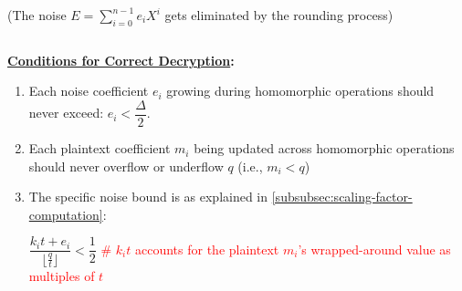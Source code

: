 \begin{tcolorbox}[title={\textbf{\tboxlabel{\ref*{subsec:bfv-enc-dec}} BFV Encryption and Decryption}}]
(The noise $E = \sum\limits_{i=0}^{n-1}e_iX^i$ gets eliminated by the rounding process) 





$ $

\textbf{\underline{Conditions for Correct Decryption}:}
\begin{enumerate}
\item Each noise coefficient $e_i$ growing during homomorphic operations should never exceed: $e_i < \dfrac{\Delta}{2}$. 

\item Each plaintext coefficient $m_i$ being updated across homomorphic operations should never overflow or underflow $q$ (i.e., $m_i < q$)

\item The specific noise bound is as explained in \autoref{subsubsec:scaling-factor-computation}:

$\dfrac{k_i t + e_i}{\lfloor\frac{q}{t}\rfloor} < \dfrac{1}{2}$ \textcolor{red}{ \# $k_i t$ accounts for the plaintext $m_i$'s wrapped-around value as multiples of $t$}
 
\end{enumerate}

\end{tcolorbox}



